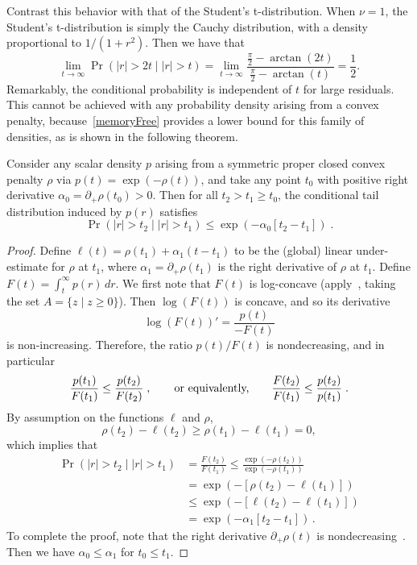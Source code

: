 \documentclass[nospthms]{svjour3}
\numberwithin{equation}{section}
\def\textt#1{\hbox{\qquad#1\qquad}}
\begin{document}
Contrast this behavior with that of the Student's t-distribution.
When $\nu = 1$, the Student's t-distribution is simply the Cauchy
distribution, with a density proportional to $1/(1 + r^2)$.  Then we
have that
\[
 \lim_{t\to\infty} \Pr(|r|>2t \mid |r|>t) =
 \lim_{t\to\infty} \frac{\frac{\pi}{2}-\arctan(2t)}{\frac{\pi}{2} - \arctan(t)}
 = \frac12.
\]
Remarkably, the conditional probability is independent of $t$ for
large residuals. This cannot be achieved with any probability density
arising from a convex penalty, because~\eqref{memoryFree} provides a
lower bound for this family of densities, as is shown in the following
theorem.





\begin{btheorem}
\label{UniversalLowerBound}
Consider any scalar density $p$ arising from a symmetric proper closed convex
penalty $\rho$ via $p(t) =
\exp(-\rho(t))$, and take any point $t_0$ with positive right derivative
 $\alpha_0 = \partial_+\rho(t_0) > 0$.
Then for all $t_2 > t_1\geq t_0$, the conditional tail
distribution induced by $p(r)$ satisfies
\begin{equation*}
\label{memoryFreeIneq}
\Pr(|r| > t_2 \mid |r| > t_1) \leq \exp(-\alpha_0[t_2 - t_1])\;.
\end{equation*}
\end{btheorem}
\begin{proof}
  Define $\ell(t) = \rho(t_1) + \alpha_1(t - t_1)$ to be the (global)
  linear under-estimate for $\rho$ at $t_1$, where
  $\alpha_1= \partial_+\rho(t_1)$ is the right derivative of $\rho$ at
  $t_1$. Define $F(t) = \int_{t}^{\infty}p(r)\, dr$. We first note
  that $F(t)$ is log-concave (apply~\cite[Theorem 3]{Prekopa1971},
  taking the set $A = \{z \mid z \geq 0\}$).  Then $\log(F(t))$ is
  concave, and so its derivative
  \[
 \log(F(t))' =  \frac{p(t)}{-F(t)}
  \]
  is non-increasing. Therefore, the ratio $p(t)/F(t)$ is nondecreasing,
   and in particular
  \[
  \frac{p(t_1)}{F(t_1)} \leq \frac{p(t_2)}{F(t_2)}\;,
  \textt{or equivalently,}
  \frac{F(t_2)}{F(t_1)} \leq \frac{p(t_2)}{p(t_1)}\;.
  \]
  By assumption on the functions $\ell$ and $\rho$,
  \[
  \rho(t_2) - \ell(t_2) \geq \rho(t_1) - \ell(t_1) = 0,
  \]
  which implies that
  \[
  \begin{aligned}
    \Pr(|r| > t_2 \mid |r| > t_1)
    &= \frac{ F(t_2)}{F(t_1)} \leq
      \frac{\exp(-\rho(t_2))}{\exp(-\rho(t_1))}
   \\& = \exp(-[\rho(t_2) - \ell(t_1)])
   \\&\leq \exp(-[\ell(t_2) - \ell(t_1)])
   \\&= \exp(-\alpha_1[t_2 - t_1])\,.
\end{aligned}
\]
To complete the proof, note that the right derivative
$\partial_+\rho(t)$ is nondecreasing~\cite[Theorem 24.1]{RTR}. Then we
have $\alpha_0 \leq \alpha_1$ for $t_0 \leq t_1$.
\end{proof}
\end{document}
